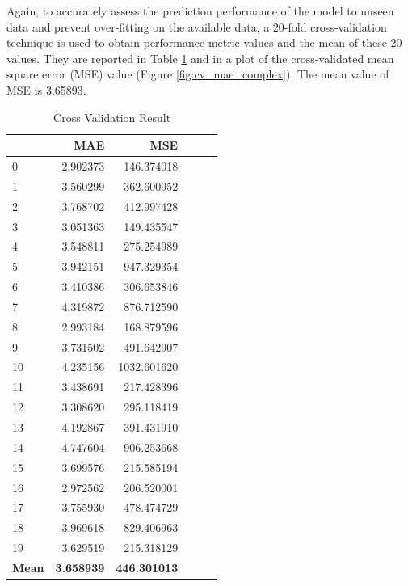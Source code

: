 \documentclass[]{article}
\begin{document}
Again, to accurately assess the prediction performance of the model to unseen data and prevent over-fitting on the available data, a 20-fold cross-validation technique is used to obtain performance metric values and the mean of these 20 values. They are reported in Table \ref{tab:cv_result_complex} and in a plot of the cross-validated mean square error (MSE) value (Figure \ref{fig:cv_mae_complex}). The mean value of MSE is 3.65893. 
%
\begin{table}
	\centering
\begin{tabular}{lrrrrr}
	\toprule
	{} &           \textbf{MAE} &       \textbf{MSE} \\
	\midrule
	0  &  2.902373 &   146.374018 \\
	1  &  3.560299 &   362.600952 \\
	2  &  3.768702 &   412.997428 \\
	3  &  3.051363 &   149.435547 \\
	4  &  3.548811 &   275.254989 \\
	5  &  3.942151 &   947.329354 \\
	6  &  3.410386 &   306.653846 \\
	7  &  4.319872 &   876.712590 \\
	8  &  2.993184 &   168.879596 \\
	9  &  3.731502 &   491.642907 \\
	10 &  4.235156 &  1032.601620 \\
	11 &  3.438691 &   217.428396 \\
	12 &  3.308620 &   295.118419 \\
	13 &  4.192867 &   391.431910 \\
	14 &  4.747604 &   906.253668 \\
	15 &  3.699576 &   215.585194 \\
	16 &  2.972562 &   206.520001 \\
	17 &  3.755930 &   478.474729 \\
	18 &  3.969618 &   829.406963 \\
	19 &  3.629519 &   215.318129 \\
	\textbf{Mean}  &  \textbf{3.658939} &   \textbf{446.301013} \\
	\bottomrule
\end{tabular}
	\caption{Cross Validation Result}
	\label{tab:cv_result_complex}
\end{table}
%
%
\end{document}
